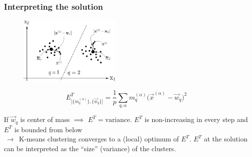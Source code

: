 \begin{frame} \frametitle{Interpreting the solution}
\begin{figure}[h]
\includegraphics[width=5.0cm]{img/section4_fig2_withincluster}
\end{figure}
$$
	E_{ \big[ \big\{ m_q^{(\alpha)} \big\}, \big\{ \vec{w}_q \big\} 
		\big] }^T = \frac{1}{p} \sum\limits_{q,\alpha} m_q^{(\alpha)}
		\big( \vec{x}^{(\alpha)} - \vec{w}_q \big)^2
$$
\begin{itemize}
 \itR If $\vec{w}_q$ is center of mass $\implies$ $E^T = \mathrm{variance}$.
 \itR $E^T$ is non-increasing in every step and $E^T$ is bounded from below \\ $\,\to\,$ K-means clustering converges to a (local) optimum of $E^T$. 
\itR $E^T$ at the solution can be interpreted as the ``size'' (variance) of the clusters.
\end{itemize} 
\end{frame}

